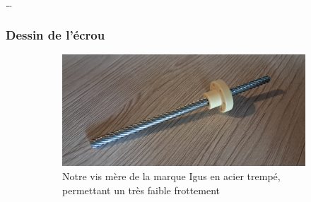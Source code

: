 \documentclass[a4paper, 11pt]{report}
\begin{document}
            \dots

        \subsubsection{Dessin de l'écrou}

            \begin{figure}
                \centering
                \begin{subfigure}[t]{0.6\textwidth}
                    \centering
                    \includegraphics[width=\textwidth]{Figures/vis_sans_fin.jpg}
                    \caption{Notre vis mère de la marque Igus en acier trempé, permettant un très faible frottement}
                \end{subfigure}
                \hfill
                \begin{subfigure}[t]{0.15\textwidth}
                    \centering

\end{subfigure}
\end{figure}
\end{document}
